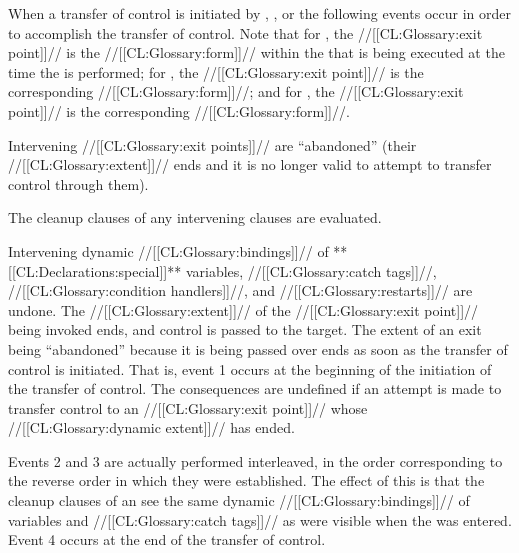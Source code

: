

 When a transfer of control is initiated by ,  , or  the following events occur in order to accomplish the transfer of control. Note that for ,  the //[[CL:Glossary:exit point]]// is the //[[CL:Glossary:form]]// within the  that is being executed at the time the  is performed; for , the //[[CL:Glossary:exit point]]// is the corresponding   //[[CL:Glossary:form]]//; and for , the //[[CL:Glossary:exit point]]// is the corresponding   //[[CL:Glossary:form]]//. 

\beginlist {} 
 Intervening //[[CL:Glossary:exit points]]// are ``abandoned''
 (\ie their //[[CL:Glossary:extent]]// ends 
      and it is no longer valid to attempt to transfer control through them).

 The cleanup clauses of any intervening  clauses
 are evaluated.

 Intervening dynamic //[[CL:Glossary:bindings]]// of **[[CL:Declarations:special]]** variables,
 //[[CL:Glossary:catch tags]]//, //[[CL:Glossary:condition handlers]]//, and //[[CL:Glossary:restarts]]//
 are undone.
 The //[[CL:Glossary:extent]]// of the //[[CL:Glossary:exit point]]// being invoked ends,
 and control is passed to the target. \endlist 
  The extent of an exit being ``abandoned'' because it is being passed over ends as soon as the transfer of control is initiated. That is, event 1 occurs at the beginning of the initiation of the transfer of control.  The consequences are undefined if an attempt is made to transfer control  to an //[[CL:Glossary:exit point]]// whose //[[CL:Glossary:dynamic extent]]// has ended.
 

Events 2 and 3 are actually performed interleaved, in the order corresponding to the reverse order in which they were established. The effect of this is that the cleanup clauses of an  see the same dynamic //[[CL:Glossary:bindings]]//  of variables and //[[CL:Glossary:catch tags]]// as were visible when the  was entered.
  Event 4 occurs at the end of the transfer of control.
 

